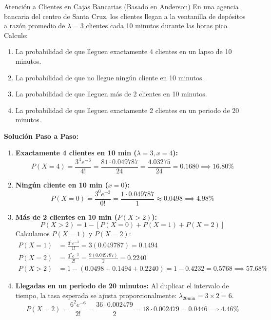 \begin{ejemplo}{Atención a Clientes en Cajas Bancarias (Basado en Anderson)}
En una agencia bancaria del centro de Santa Cruz, los clientes llegan a la ventanilla de depósitos a razón promedio de $\lambda = 3$ clientes cada 10 minutos durante las horas pico. Calcule:
\begin{enumerate}[label=\alph*)]
    \item La probabilidad de que lleguen exactamente 4 clientes en un lapso de 10 minutos.
    \item La probabilidad de que no llegue ningún cliente en 10 minutos.
    \item La probabilidad de que lleguen más de 2 clientes en 10 minutos.
    \item La probabilidad de que lleguen exactamente 2 clientes en un periodo de 20 minutos.
\end{enumerate}

\tcbline
\textbf{Solución Paso a Paso:}
\begin{enumerate}[label=\alph*)]
    \item \textbf{Exactamente 4 clientes en 10 min ($\lambda = 3, x = 4$):}
    \[
    P(X = 4) = \frac{3^4 e^{-3}}{4!} = \frac{81 \cdot 0.049787}{24} = \frac{4.03275}{24} = 0.1680 \implies 16.80\%
    \]
    \item \textbf{Ningún cliente en 10 min ($x = 0$):}
    \[
    P(X = 0) = \frac{3^0 e^{-3}}{0!} = \frac{1 \cdot 0.049787}{1} \approx 0.0498 \implies 4.98\%
    \]
    \item \textbf{Más de 2 clientes en 10 min ($P(X > 2)$):}
    \[
    P(X > 2) = 1 - [P(X = 0) + P(X = 1) + P(X = 2)]
    \]
    Calculamos $P(X = 1)$ y $P(X = 2)$:
    \begin{align*}
        P(X = 1) &= \frac{3^1 e^{-3}}{1!} = 3(0.049787) = 0.1494 \\
        P(X = 2) &= \frac{3^2 e^{-3}}{2!} = \frac{9(0.049787)}{2} = 0.2240 \\
        P(X > 2) &= 1 - (0.0498 + 0.1494 + 0.2240) = 1 - 0.4232 = 0.5768 \implies 57.68\%
    \end{align*}
    \item \textbf{Llegadas en un periodo de 20 minutos:}
    Al duplicar el intervalo de tiempo, la tasa esperada se ajusta proporcionalmente: $\lambda_{20\text{min}} = 3 \times 2 = 6$.
    \[
    P(X = 2) = \frac{6^2 e^{-6}}{2!} = \frac{36 \cdot 0.002479}{2} = 18 \cdot 0.002479 = 0.0446 \implies 4.46\%
    \]
\end{enumerate}
\end{ejemplo}


